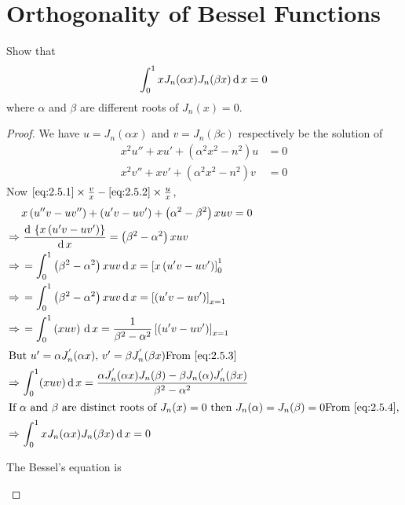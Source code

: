 \documentclass[../main-sheet.tex]{subfiles}
\begin{document}
\section{Orthogonality of Bessel Functions}
\begin{prob}
    Show that 
    \[
        \int_0^1 xJ_n(\alpha x)J_n(\beta x)\,\mathrm{d}\, x=0
    \]
    where $ \alpha $ and $ \beta $ are different roots of $ J_n(x)=0 $.
\end{prob}
\begin{proof}
    We have $ u=J_n(\alpha x) $ and $ v=J_n(\beta c) $ respectively be the solution of 
    \begin{align}
        x^2u''+xu'+\left( \alpha^2x^2-n^2 \right)u&=0 \label{eq:2.5.1}\\
        x^2v''+xv'+\left( \alpha^2x^2-n^2 \right)v&=0 \label{eq:2.5.2}
    \end{align}
    Now $ \eqref{eq:2.5.1} \times \frac{v}{x}-\eqref{eq:2.5.2}\times \frac{u}{x}$,
    \begin{align}
        & x\left( u''v-uv'' \right)+\left( u'v-uv' \right)+\left( \alpha^2-\beta^2 \right)xuv=0\notag\\
        \Rightarrow\,& \ddx{\left\{ x\left( u'v-uv' \right)\right\}}=\left( \beta^2 -\alpha^2 \right)xuv\notag\\
        \Rightarrow\, &= \int_0^1 \left( \beta^2-\alpha^2 \right)xuv\dx =\left[ x\left( u'v-uv' \right) \right]_0^1\notag\\
        \Rightarrow\, &= \int_0^1 \left( \beta^2-\alpha^2 \right)xuv\dx =\left[ \left( u'v-uv' \right) \right]_{x=1}\notag\\
        \Rightarrow\, &= \int_0^1 \left( xuv \right)\dx =\frac{1}{\beta^2-\alpha^2}\left[ \left( u'v-uv' \right) \right]_{x=1}\label{eq:2.5.3}\\
        \intertext{But $ u'=\alpha J_n^{'}(\alpha x),\,v'=\beta J_n^{'}(\beta x) $\newline From \eqref{eq:2.5.3}}
        \Rightarrow\,& \int_0^1 (xuv)\dx =\frac{\alpha J_n^{'}(\alpha x) J_n(\beta)  -\beta J_n(\alpha) J_n^{'}(\beta x)}{\beta^2-\alpha^2}\label{eq:2.5.4}\\
        \intertext{If $ \alpha $ and $ \beta  $ are distinct roots of $ J_n(x)=0 $ then $ J_n(\alpha)=J_n(\beta)=0 $\newline From \eqref{eq:2.5.4},}
        \Rightarrow\, & \int_0^1 xJ_n(\alpha x)J_n(\beta x)\dx=0\notag
    \end{align}
    \begin{note}
        The Bessel's equation is

\end{note}
\end{proof}
\end{document}
